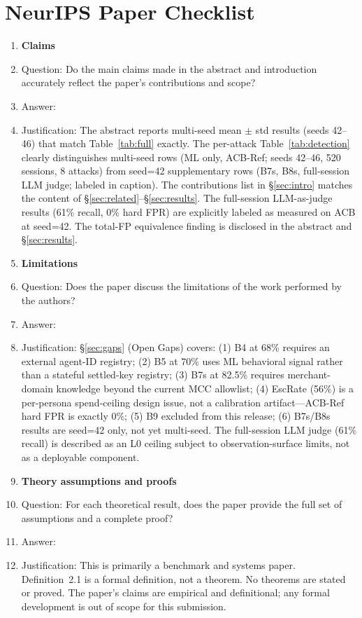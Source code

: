 \section*{NeurIPS Paper Checklist}

\begin{enumerate}

\item {\bf Claims}
    \item[] Question: Do the main claims made in the abstract and introduction accurately reflect the paper's contributions and scope?
    \item[] Answer: \answerYes{}
    \item[] Justification: The abstract reports multi-seed mean $\pm$ std results (seeds 42--46) that match Table~\ref{tab:full} exactly. The per-attack Table~\ref{tab:detection} clearly distinguishes multi-seed rows (ML only, ACB-Ref; seeds 42--46, 520 sessions, 8 attacks) from seed=42 supplementary rows (B7s, B8s, full-session LLM judge; labeled in caption). The contributions list in \S\ref{sec:intro} matches the content of \S\ref{sec:related}--\S\ref{sec:results}. The full-session LLM-as-judge results (61\% recall, 0\% hard FPR) are explicitly labeled as measured on ACB at seed=42. The total-FP equivalence finding is disclosed in the abstract and \S\ref{sec:results}.

\item {\bf Limitations}
    \item[] Question: Does the paper discuss the limitations of the work performed by the authors?
    \item[] Answer: \answerYes{}
    \item[] Justification: \S\ref{sec:gaps} (Open Gaps) covers: (1) B4 at 68\% requires an external agent-ID registry; (2) B5 at 70\% uses ML behavioral signal rather than a stateful settled-key registry; (3) B7s at 82.5\% requires merchant-domain knowledge beyond the current MCC allowlist; (4) EscRate (56\%) is a per-persona spend-ceiling design issue, not a calibration artifact---ACB-Ref hard FPR is exactly 0\%; (5) B9 excluded from this release; (6) B7s/B8s results are seed=42 only, not yet multi-seed. The full-session LLM judge (61\% recall) is described as an L0 ceiling subject to observation-surface limits, not as a deployable component.

\item {\bf Theory assumptions and proofs}
    \item[] Question: For each theoretical result, does the paper provide the full set of assumptions and a complete proof?
    \item[] Answer: \answerNA{}
    \item[] Justification: This is primarily a benchmark and systems paper. Definition~2.1 is a formal definition, not a theorem. No theorems are stated or proved. The paper's claims are empirical and definitional; any formal development is out of scope for this submission.


\end{enumerate}
